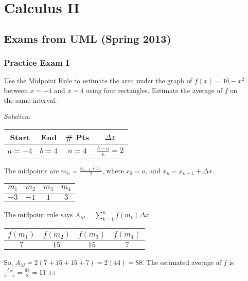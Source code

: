 \documentclass[crop=false,class=article,oneside]{standalone}
\begin{document}
    \ifx\ifmathcoursescalculusII\undefined
        \section*{Calculus II}
        \setcounter{section}{1}
    \fi
    \subsection{Exams from UML (Spring 2013)}
        \subsubsection{Practice Exam I}
        \begin{problem}
        Use the Midpoint Rule to estimate the area under the
        graph of $f(x)=16-x^{2}$ between $x=-4$ and $x=4$ using
        four rectangles. Estimate the average of $f$
        on the same interval.
        \end{problem}
        \begin{proof}[Solution]
            \
            \begin{table}[H]
                \centering
                \begin{tabular}{|c|c|c|c|}
                    \hline
                    Start&End&\# Pts&$\Delta x$\\
                    \hline
                    $a=-4$&$b=4$&$n=4$&$\frac{b-a}{n}=2$\\
                    \hline
                \end{tabular}
            \end{table}
            The midpoints are $m_{n}=\frac{x_{n-1}+x_{n}}{2}$,
            where $x_{0}=a$, and $x_{n}=x_{n-1}+\Delta x$.
            \begin{table}[H]
                \centering
                \begin{tabular}{|c|c|c|c|}
                    \hline
                    $m_{1}$&$m_{2}$&$m_{3}$&$m_{4}$\\
                    \hline
                    $-3$&$-1$&$1$&$3$\\
                    \hline
                \end{tabular}
            \end{table}
            The midpoint rule says $A_{M}=\sum_{k=1}^{n}f(m_{k})\Delta x$
            \begin{table}[H]
                \centering
                \begin{tabular}{|c|c|c|c|}
                    \hline
                    $f(m_{1})$&$f(m_{2})$&$f(m_{3})$&$f(m_{4})$\\
                    \hline
                    $7$&$15$&$15$&$7$\\
                    \hline
                \end{tabular}
            \end{table}
            So, $A_{M}=2(7+15+15+7)=2(44)=88$.
            The estimated average of $f$ is
            $\frac{A_{m}}{b-a}=\frac{88}{8}=11$
        \end{proof}
\end{document}
